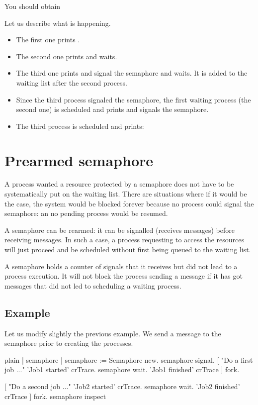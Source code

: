 \documentclass[10pt,twoside,english]{_support/latex/sbabook/sbabook}
\begin{document}
You should obtain 

Let us describe what is happening. 

\begin{itemize}
\item The first one prints . 
\item The second one prints  and waits.
\item The third one prints  and signal the semaphore and waits. It is added to the waiting list after the second process.
\item Since the third process signaled the semaphore, the first waiting process (the second one) is scheduled and prints  and signals the semaphore. 
\item The third process is scheduled and prints: 
\end{itemize}
\section{Prearmed semaphore}
A process wanted a resource protected by a semaphore does not have to be systematically put on the waiting list.
There are situations where if it would be the case, the system would be blocked forever because no process could signal
the semaphore: an no pending process would be resumed. 

A semaphore can be rearmed: it can be signalled (receives  messages) before receiving  messages. 
In such a case, a process requesting to access the resources will just proceed and be scheduled without first being queued to the waiting list.

A semaphore holds a counter of signals that it receives but did not lead to a process execution.
It will not block the process sending a  message if it has got   messages that did not led to scheduling a waiting process.
\subsection{Example }
Let us modify slightly the previous example.
We send a  message to the semaphore prior to creating the processes.

\begin{displaycode}{plain}
| semaphore |
semaphore := Semaphore new.
semaphore signal. 
[ "Do a first job ..."
	'Job1 started' crTrace.
	semaphore wait. 
	'Job1 finished' crTrace
	] fork.

[ "Do a second job ..."
	'Job2 started' crTrace.
	semaphore wait. 
	'Job2 finished' crTrace
	] fork.
semaphore inspect
\end{displaycode}
\end{document}
